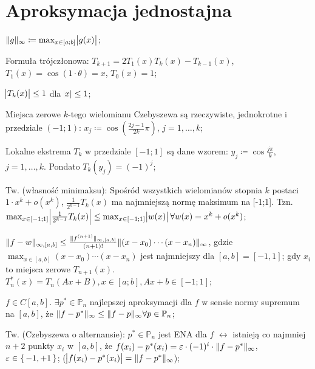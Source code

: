 \section{Aproksymacja jednostajna}

\entry
$\|g\|_\infty \coloneqq \max_{x \in [a;b]} \abs{g(x)}$;

\entry
Formuła trójczłonowa:
$T_{k + 1} = 2T_1(x)T_k(x) - T_{k-1}(x)$,
$T_1(x) = \cos(1 \cdot \theta)=x$,
$T_0(x) = 1$;

\entry
$\abs{T_k(x)} \leq 1$
dla
$\abs{x} \leq 1$;

\entry
Miejsca zerowe $k$-tego wielomianu Czebyszewa są rzeczywiste, jednokrotne i przedziale $(-1;1)$: 
$x_j \coloneqq \cos(\frac{2j-1}{2k}\pi)$, 
$j=1,\ldots,k$;

\entry
Lokalne ekstrema $T_k$ w przedziale $[-1;1]$ są dane wzorem:
$y_j \coloneqq \cos \frac{j\pi}{k}$,
$j=1,\ldots,k$.
Pondato
$T_k(y_j) = (-1)^j$;

\entry
Tw. (własność minimaksu):
Spośród wszystkich wielomianów stopnia $k$ postaci
$1 \cdot x^k + o(x^k)$,
$\frac{1}{2^{k-1}} T_k(x)$
ma najmniejszą normę maksimum na [-1;1].
Tzn.
$\max_{x \in [-1;1]} \abs{\frac{1}{2^{k-1}} T_k(x)} \leq 
\max_{x \in [-1;1]} \abs{w(x)} 
\forall w(x) = x^k + o(x^k)$;

\entry
$\|f-w\|_{\infty, [a,b]} \leq 
\frac{\|f^{(n+1)}\|_{\infty, [a,b]}}{(n+1)!} 
\|(x-x_0) \cdots (x - x_n)\|_\infty$, 
gdzie
$\max_{x\in[a,b]} (x-x_0)\cdots(x-x_n)$
jest najmniejszy dla 
$[a,b] = [-1,1]$;
gdy $x_i$ to miejsca zerowe $T_{n + 1}(x)$.
\entry
$T^{*}_n(x) = T_n(Ax+B), x \in [a;b], Ax+b \in [-1;1]$;

\entry
$f \in C[a,b]$.
$\exists p^{*} \in \mathbb{P}_n$ 
najlepszej aproksymacji dla $f$ w sensie normy supremum na $[a,b]$, że
$\|f - p^{*}\|_\infty \leq \|f - p\|_\infty \forall p\in \mathbb{P}_n$;

\entry
Tw. (Czebyszewa o alternansie):
$p^{*} \in \mathbb{P}_n$
jest ENA dla $f$
$\leftrightarrow$
istnieją co najmniej $n+2$ punkty $x_i$ w $[a,b]$, że
$f(x_i) - p^{*}(x_i) = \varepsilon \cdot (-1)^i \cdot \|f - p^{*}\|_\infty$,
$\varepsilon \in \set{-1,+1}$;
($\abs{f(x_i) - p^{*}(x_i)} = \|f - p^{*}\|_\infty$);

